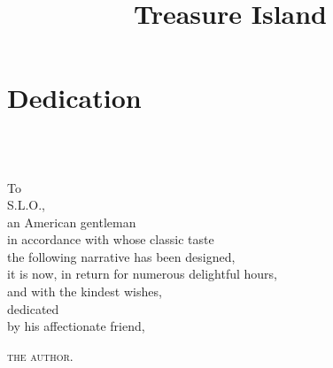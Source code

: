 \documentclass[
paper=5.5in:8.5in,
]{scrbook} %
\title{Treasure Island}
\begin{document}
\frontmatter
\pagestyle{empty}

 
 
 
 
 
 



\pagestyle{plain}



\let\originalheadstartvskip=\chapterheadstartvskip
\renewcommand*{\chapterheadstartvskip}{\vspace*{-0em}} 
\tableofcontents



\let\chapterheadstartvskip=\originalheadstartvskip

\cleardoubleevenpage

\listoffigures

\chapter*{Dedication}
~\\
~\\
\begin{center}\large
To\\
S.L.O.,\\ 
an American gentleman\\ 
in accordance with whose classic taste\\ 
the following narrative has been designed,\\ 
it is now, in return for numerous delightful hours,\\ 
and with the kindest wishes,\\
dedicated\\
 by his affectionate friend,\\
\begin{flushright}\scshape
the author.
\end{flushright}
\end{center}
\thispagestyle{empty}
\clearpage








{
\renewcommand{\cleardoublepage}{\newpage}
\mainmatter
}
\pagestyle{headings}
\renewcommand*{\chapterpagestyle}{plain}
\end{document}
